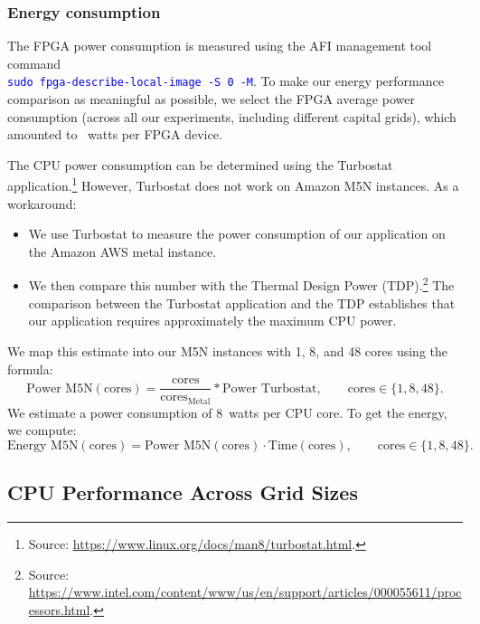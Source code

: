 \documentclass[12pt,american]{article}
\newcommand{\resultsfolder}{./results}
\newcommand{\fpgaIpowerconsumption}{}
\newcommand{\cpuIpowerconsumption}{8}
\begin{document}
\subsubsection{Energy consumption} \label{app:pow} 

The FPGA power consumption is measured using the AFI management tool command\\ \textcolor{blue}{\lstinline{sudo fpga-describe-local-image -S 0 -M}}. To make our energy performance comparison as meaningful as possible, we select the FPGA average power consumption (across all our experiments, including different capital grids), which amounted to \fpgaIpowerconsumption\, watts per FPGA device.

The CPU power consumption can be determined using the Turbostat application.\footnote{Source: \href{https://www.linux.org/docs/man8/turbostat.html}{https://www.linux.org/docs/man8/turbostat.html}.} However, Turbostat does not work on Amazon M5N instances. As a workaround:

\begin{itemize}

\item We use Turbostat to measure the power consumption of our application on the Amazon AWS metal instance.

\item We then compare this number with the Thermal Design Power (TDP).\footnote{Source: \href{https://www.intel.com/content/www/us/en/support/articles/000055611/processors.html}{https://www.intel.com/content/www/us/en/support/articles/000055611/processors.html}.} The comparison between the Turbostat application and the TDP establishes that our application requires approximately the maximum CPU power.
\end{itemize}
We map this estimate into our M5N instances with 1, 8, and 48 cores using the formula:
\begin{equation*}
\text{Power M5N}(\text{cores}) = \frac{\text{cores}}{\text{cores}_{\text{Metal}}}*\text{Power Turbostat},\qquad \text{cores}\in\{1,8,48\}. 
\end{equation*}
We estimate a power consumption of \cpuIpowerconsumption\ watts per CPU core. To get the energy, we compute:
\begin{equation*}
\text{Energy M5N}(\text{cores}) = \text{Power M5N}(\text{cores})\cdot \text{Time}(\text{cores}),\qquad \text{cores}\in\{1,8,48\}.
\end{equation*}

\subsection{CPU Performance Across Grid Sizes}\label{app:gri} 
\end{document}
